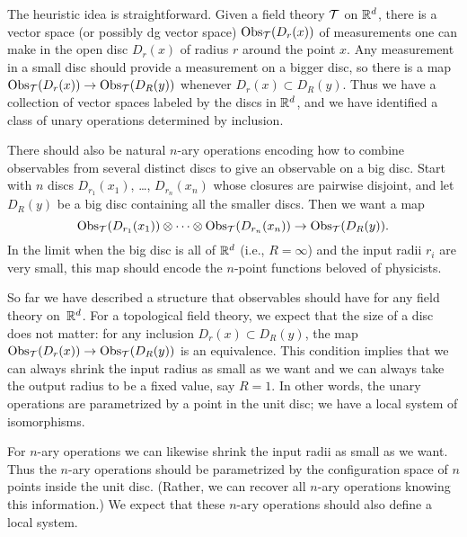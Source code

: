 \documentclass[11pt]{amsart}
\begin{document}
The heuristic idea is straightforward.
Given a field theory $\mathcal T$ on $\mathbb R^d$, there is a vector space (or possibly dg vector space) ${\rm Obs}_\mathcal T(D_r(x))$ of measurements one can make in the open disc $D_r(x)$ of radius $r$ around the point $x$.
Any measurement in a small disc should provide a measurement on a bigger disc,
so there is a map ${\rm Obs}_\mathcal T(D_r(x)) \to {\rm Obs}_\mathcal T(D_R(y))$ whenever $D_r(x) \subset D_R(y)$.
Thus we have a collection of vector spaces labeled by the discs in $\mathbb R^d$,
and we have identified a class of unary operations determined by inclusion.

There should also be natural $n$-ary operations encoding how to combine observables from several distinct discs to give an observable on a big disc.
Start with $n$ discs $D_{r_1}(x_1)$, \dots , $D_{r_n}(x_n)$ whose closures are pairwise disjoint, and let $D_R(y)$ be a big disc containing all the smaller discs.
Then we want a map
\[
{\rm Obs}_\mathcal T(D_{r_1}(x_1)) \otimes \cdots \otimes {\rm Obs}_\mathcal T(D_{r_n}(x_n)) \to {\rm Obs}_\mathcal T(D_R(y)).
\]
In the limit when the big disc is all of $\mathbb R^d$ (i.e., $R = \infty$) and the input radii $r_i$ are very small, 
this map should encode the $n$-point functions beloved of physicists.

So far we have described a structure that observables should have for any field theory on~$\mathbb R^d$.
For a topological field theory, we expect that the size of a disc does not matter:
for any inclusion $D_r(x) \subset D_R(y)$, the map ${\rm Obs}_\mathcal T(D_r(x)) \to {\rm Obs}_\mathcal T(D_R(y))$ is an equivalence.
This condition implies that we can always shrink the input radius as small as we want and we can always take the output radius to be a fixed value, say $R =1$.
In other words, the unary operations are parametrized by a point in the unit disc;
we have a local system of isomorphisms.

For $n$-ary operations we can likewise shrink the input radii as small as we want.
Thus the $n$-ary operations should be parametrized by the configuration space of $n$ points inside the unit disc.
(Rather, we can recover all $n$-ary operations knowing this information.)
We expect that these $n$-ary operations should also define a local system.
\end{document}
